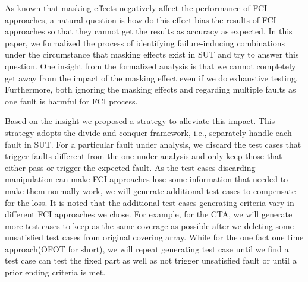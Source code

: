 \documentclass{sig-alternate}
\begin{document}

As known that masking effects negatively affect the performance of FCI approaches, a natural question is how do this effect bias the results of FCI approaches so that they cannot get the results as accuracy as expected. In this paper, we formalized the process of identifying failure-inducing combinations under the circumstance that masking effects exist in SUT and try to answer this question. One insight from the formalized analysis is that we cannot completely get away from the impact of the masking effect even if we do exhaustive testing. Furthermore, both ignoring the masking effects and regarding multiple faults as one fault is harmful for FCI process.

Based on the insight we proposed a strategy to alleviate this impact. This strategy adopts the divide and conquer framework, i.e., separately handle each fault in SUT. For a particular fault under analysis, we discard the test cases that trigger faults different from the one under analysis and only keep those that either pass or trigger the expected fault. As the test cases discarding manipulation can make FCI approaches lose some information that needed to make them normally work, we will generate additional test cases to compensate for the loss. It is noted that the additional test cases generating criteria vary in different FCI approaches we chose. For example, for the CTA, we will generate more test cases to keep as the same coverage as possible after we deleting some unsatisfied test cases from original covering array. While for the one fact one time approach(OFOT for short), we will repeat generating test case until we find a test case can test the fixed part as well as not trigger unsatisfied fault or until a prior ending criteria is met.

\end{document}
